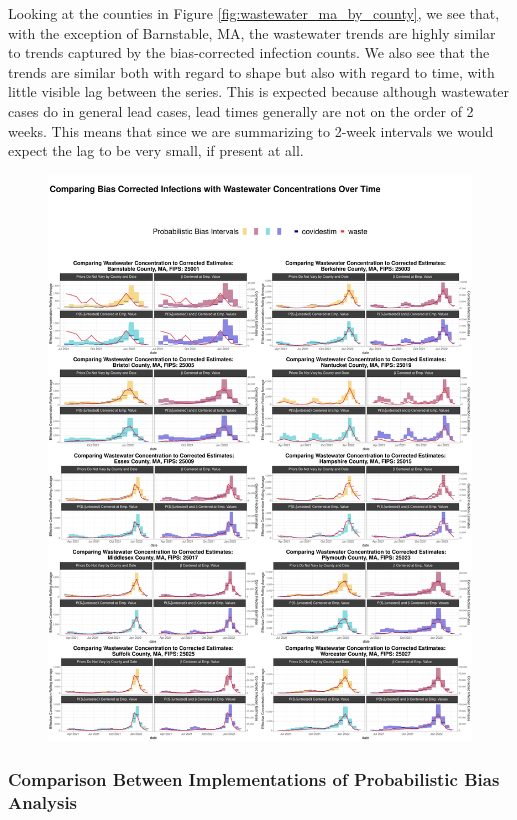 \documentclass[12pt,twoside]{smiththesis}
\begin{document}
Looking at the counties in Figure \ref{fig:wastewater_ma_by_county}, we see that, with the exception of Barnstable, MA, the wastewater trends are highly similar to trends captured by the bias-corrected infection counts. We also see that the trends are similar both with regard to shape but also with regard to time, with little visible lag between the series. This is expected because although wastewater cases do in general lead cases, lead times generally are not on the order of 2 weeks. This means that since we are summarizing to 2-week intervals we would expect the lag to be very small, if present at all.
\begin{figure}
\includegraphics[width=1\linewidth]{figure/wastewater_ma_by_county} \caption{\label{fig:wastewater_ma_by_county}}\label{fig:unnamed-chunk-90}
\end{figure}
\hypertarget{comparison-between-implementations-of-probabilistic-bias-analysis}{%
\subsubsection{Comparison Between Implementations of Probabilistic Bias Analysis}\label{comparison-between-implementations-of-probabilistic-bias-analysis}}
\end{document}
